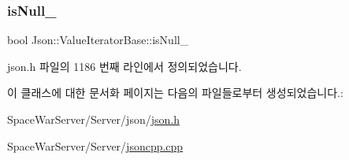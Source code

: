 \subsubsection{\texorpdfstring{is\+Null\+\_\+}{isNull\_}}
{\footnotesize\ttfamily bool Json\+::\+Value\+Iterator\+Base\+::is\+Null\+\_\+\hspace{0.3cm}{\ttfamily [private]}}



json.\+h 파일의 1186 번째 라인에서 정의되었습니다.



이 클래스에 대한 문서화 페이지는 다음의 파일들로부터 생성되었습니다.\+:\begin{DoxyCompactItemize}
\item 
Space\+War\+Server/\+Server/json/\hyperlink{json_8h}{json.\+h}\item 
Space\+War\+Server/\+Server/\hyperlink{jsoncpp_8cpp}{jsoncpp.\+cpp}\end{DoxyCompactItemize}
